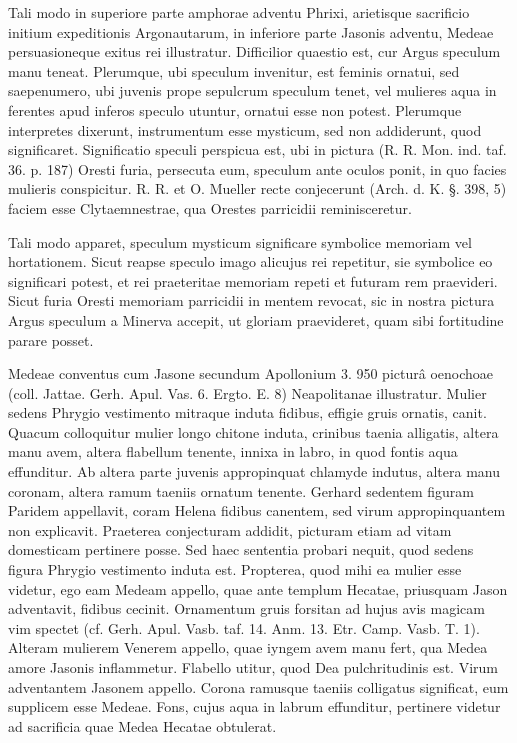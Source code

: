 \documentclass[a4paper, 11pt, oneside, polutonikogreek, german]{article}
\begin{document}
Tali modo in superiore parte amphorae adventu Phrixi, arietisque sacrificio initium expeditionis Argonautarum, in inferiore parte Jasonis adventu, Medeae persuasioneque exitus rei illustratur. Difficilior quaestio est, cur Argus speculum manu teneat. Plerumque, ubi speculum invenitur, est feminis ornatui, sed saepenumero, ubi juvenis prope sepulcrum speculum tenet, vel mulieres aqua in ferentes apud inferos speculo utuntur, ornatui esse non potest. Plerumque interpretes dixerunt, instrumentum esse mysticum, sed non addiderunt, quod significaret. Significatio speculi perspicua est, ubi in pictura (R. R. Mon. ind. taf. 36. p. 187) Oresti furia, persecuta eum, speculum ante oculos ponit, in quo facies mulieris conspicitur. R. R. et O. Mueller recte conjecerunt (Arch. d. K. §. 398, 5) faciem esse Clytaemnestrae, qua Orestes parricidii reminisceretur.

Tali modo apparet, speculum mysticum significare symbolice memoriam vel hortationem. Sicut reapse speculo imago alicujus rei repetitur, sie symbolice eo significari potest, et rei praeteritae memoriam repeti et futuram rem praevideri. Sicut furia Oresti memoriam parricidii in mentem revocat, sic in nostra pictura Argus speculum a Minerva accepit, ut gloriam praevideret, quam sibi fortitudine parare posset.

Medeae conventus cum Jasone secundum Apollonium 3. 950 picturâ oenochoae (coll. Jattae. Gerh. Apul. Vas. 6. Ergto. E. 8) Neapolitanae illustratur. Mulier sedens Phrygio vestimento mitraque induta fidibus, effigie gruis ornatis, canit. Quacum colloquitur mulier longo chitone induta, crinibus taenia alligatis, altera manu avem, altera flabellum tenente, innixa in labro, in quod fontis aqua effunditur. Ab altera parte juvenis appropinquat chlamyde indutus, altera manu coronam, altera ramum taeniis ornatum tenente. Gerhard sedentem figuram Paridem appellavit, coram Helena fidibus canentem, sed virum appropinquantem non explicavit. Praeterea conjecturam addidit, picturam etiam ad vitam domesticam pertinere posse. Sed haec sententia probari nequit, quod sedens figura Phrygio vestimento induta est. Propterea, quod mihi ea mulier esse videtur, ego eam Medeam appello, quae ante templum Hecatae, priusquam Jason adventavit, fidibus cecinit. Ornamentum gruis forsitan ad hujus avis magicam vim spectet (cf. Gerh. Apul. Vasb. taf. 14. Anm. 13. Etr. Camp. Vasb. T. 1). Alteram mulierem Venerem appello, quae iyngem avem manu fert, qua Medea amore Jasonis inflammetur. Flabello utitur, quod Dea pulchritudinis est. Virum adventantem Jasonem appello. Corona ramusque taeniis colligatus significat, eum supplicem esse Medeae. Fons, cujus aqua in labrum effunditur, pertinere videtur ad sacrificia quae Medea Hecatae obtulerat.
\end{document}
